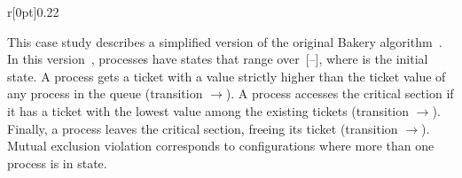 %
\begin{wrapfigure}{r}[0pt]{0.22\linewidth}
\vspace{-12pt}%
\hfill%
\vspace{-12pt}%
\end{wrapfigure}
%
This case study describes a simplified version of the original Bakery
algorithm~\cite{Bakery}.
%
In this version~\cite{Marcus:thesis}, processes have states that range
over~[--], where  is the initial state.
%
A process gets a ticket with a value strictly higher than the ticket
value of any process in the queue (transition
$\rightarrow$).
%
A process accesses the critical section if it has a ticket with the
lowest value among the existing tickets (transition
$\rightarrow$).
%
Finally, a process leaves the critical section, freeing its ticket
(transition $\rightarrow$).
%
Mutual exclusion violation corresponds to configurations where more
than one process is in state.
%
